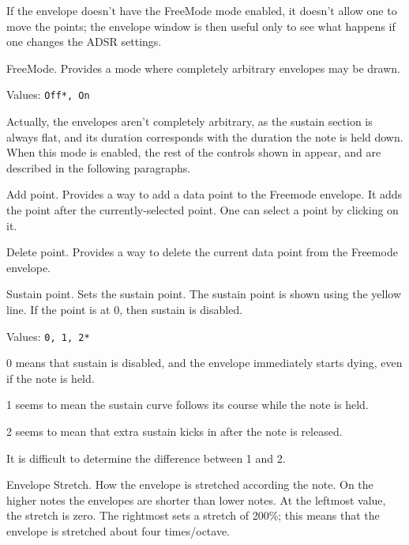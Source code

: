    If the envelope doesn't have the FreeMode mode enabled, it doesn't allow
   one to move the points; the envelope window is then useful only to see
   what happens if one changes the ADSR settings.

   FreeMode.  Provides a mode where completely arbitrary envelopes may be
   drawn.

   Values: \texttt{Off*, On}

   Actually, the envelopes aren't completely arbitrary, as the sustain
   section is always flat, and its duration corresponds with the duration
   the note is held down.
   When this mode is enabled, the rest of the controls shown in
   appear, and are described in the following paragraphs.

   Add point.
   Provides a way to add a data point to the Freemode envelope.
   It adds the point after the currently-selected point. One can select a
   point by clicking on it.

   Delete point.
   Provides a way to delete the current data point from the Freemode envelope.

   Sustain point.
   Sets the sustain point.
   The sustain point is shown using the yellow line.
   If the point is at 0, then sustain is disabled.

   Values: \texttt{0, 1, 2*}

   \begin{enumber}
      \item{0} means that sustain is disabled, and the envelope immediately
      starts dying, even if the note is held.
      \item{1} seems to mean the sustain curve follows its course while the
      note is held.
      \item{2} seems to mean that extra sustain kicks in after the note is
      released.
   \end{enumber}

   It is difficult to determine the difference between 1 and 2.

   Envelope Stretch.
   How the envelope is stretched according the note. On the higher notes the
   envelopes are shorter than lower notes. At the leftmost value, the
   stretch is zero. The rightmost sets a stretch of 200\%; this means that the
   envelope is stretched about four times/octave.

